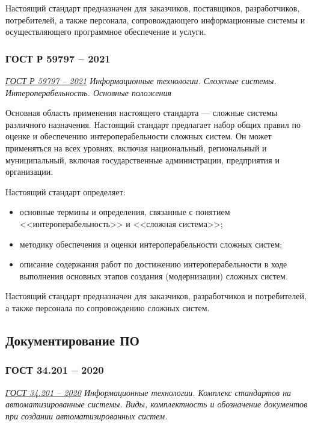 Настоящий стандарт предназначен для заказчиков, поставщиков, разработчиков,
потребителей, а также персонала, сопровождающего информационные системы
и осуществляющего программное обеспечение и услуги.

\subsubsection{ГОСТ Р 59797 -- 2021}

\emph{\href{https://docs.cntd.ru/document/1200181353}{ГОСТ Р 59797 -- 2021}
Информационные технологии. Сложные системы. Интероперабельность. Основные положения
}

Основная область применения настоящего стандарта
--- сложные системы различного назначения.
Настоящий стандарт предлагает набор общих правил по оценке
и обеспечению интероперабельности сложных систем.
Он может применяться на всех уровнях, включая национальный,
региональный и муниципальный,
включая государственные администрации, предприятия и организации.

Настоящий стандарт определяет:

\begin{itemize}
	\item основные термины и определения,
		связанные с понятием <<интероперабельность>> и <<сложная система>>;
	\item методику обеспечения
		и оценки интероперабельности сложных систем;
	\item описание содержания работ
		по достижению интероперабельности в ходе выполнения основных
		этапов создания (модернизации) сложных систем.
\end{itemize}

Настоящий стандарт предназначен для заказчиков,
разработчиков и потребителей,
а также персонала по сопровождению сложных систем.

\subsection{Документирование ПО}

\subsubsection{ГОСТ 34.201 -- 2020}

\emph{\href{https://docs.cntd.ru/document/1200181803}{ГОСТ 34.201 -- 2020}
Информационные технологии.
Комплекс стандартов на автоматизированные системы.
Виды, комплектность и обозначение документов
при создании автоматизированных систем.
}

